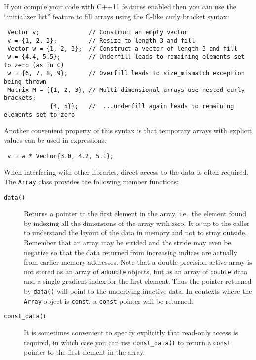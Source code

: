 \documentclass[a4,oneside]{book}
\def\codesize{\small}
\def\code#1{{\codesize\texttt{#1}}}
\def\citem#1{\item[{\codesize\texttt{#1}}]}
\def\cxx11{\marginpar{\rotatebox[origin=rb]{90}{\textbf{C++11 only~~~}}}}
\begin{document}
\cxx11 \begin{leftbar} If you compile your code with C++11 features
  enabled then you can use the ``initializer list'' feature to fill
  arrays using the C-like curly bracket syntax:
\begin{lstlisting}
 Vector v;              // Construct an empty vector
 v = {1, 2, 3};         // Resize to length 3 and fill
 Vector w = {1, 2, 3};  // Construct a vector of length 3 and fill
 w = {4.4, 5.5};        // Underfill leads to remaining elements set to zero (as in C)
 w = {6, 7, 8, 9};      // Overfill leads to size_mismatch exception being thrown
 Matrix M = {{1, 2, 3}, // Multi-dimensional arrays use nested curly brackets;
             {4, 5}};   //  ...underfill again leads to remaining elements set to zero
\end{lstlisting}
Another convenient property of this syntax is that temporary arrays
with explicit values can be used in expressions:
\begin{lstlisting}
 v = w * Vector{3.0, 4.2, 5.1};
\end{lstlisting}
\end{leftbar}

When interfacing with other libraries, direct access to the data is
often required. The \code{Array} class provides the following member
functions:
\begin{description}
\citem{data()} Returns a pointer to the first element in the array,
i.e.\ the element found by indexing all the dimensions of the array
with zero. It is up to the caller to understand the layout of the data
in memory and not to stray outside.  Remember that an array may be
strided and the stride may even be negative so that the data returned
from increasing indices are actually from earlier memory
addresses. Note that a double-precision active array is not stored as
an array of \code{adouble} objects, but as an array of \code{double}
data and a single gradient index for the first element. Thus the
pointer returned by \code{data()} will point to the underlying
inactive data.  In contexts where the \code{Array} object is
\code{const}, a \code{const} pointer will be returned.
%
\citem{const\_data()} It is sometimes convenient to specify explicitly
that read-only access is required, in which case you can use
\code{const\_data()} to return a \code{const} pointer to the first
element in the array.
\end{description} 
\end{document}
